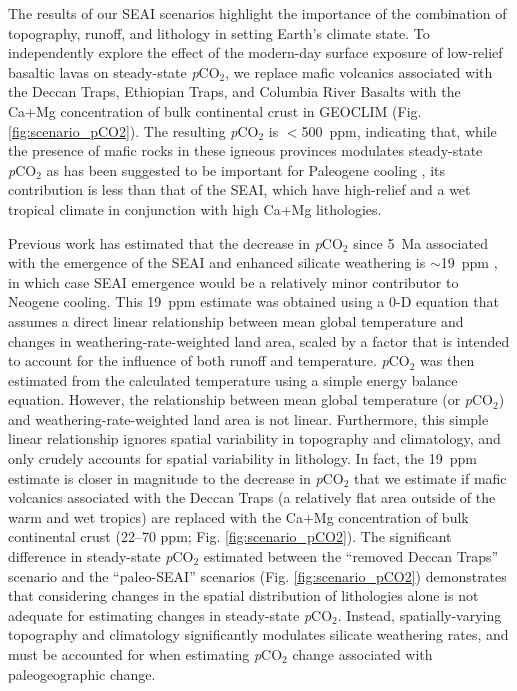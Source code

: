 \documentclass[9pt,twocolumn,twoside,lineno]{pnas-new}
\newcommand{\pCOtwo}{\textit{p}CO$_{2}$\xspace}
\begin{document}
The results of our SEAI scenarios highlight the importance of the combination of topography, runoff, and lithology in setting Earth's climate state. To independently explore the effect of the modern-day surface exposure of low-relief basaltic lavas on steady-state \pCOtwo \cite{Kent2013a}, we replace mafic volcanics associated with the Deccan Traps, Ethiopian Traps, and Columbia River Basalts with the Ca+Mg concentration of bulk continental crust in GEOCLIM (Fig. \ref{fig:scenario_pCO2}). The resulting \pCOtwo is $<$500~ppm, indicating that, while the presence of mafic rocks in these igneous provinces modulates steady-state \pCOtwo as has been suggested to be important for Paleogene cooling \cite{Kent2013a}, its contribution is less than that of the SEAI, which have high-relief and a wet tropical climate in conjunction with high Ca+Mg lithologies.

Previous work has estimated that the decrease in \pCOtwo since 5~Ma associated with the emergence of the SEAI and enhanced silicate weathering is $\sim$19~ppm \cite{Molnar2015a}, in which case SEAI emergence would be a relatively minor contributor to Neogene cooling. This 19~ppm estimate was obtained using a 0-D equation that assumes a direct linear relationship between mean global temperature and changes in weathering-rate-weighted land area, scaled by a factor that is intended to account for the influence of both runoff and temperature. \pCOtwo was then estimated from the calculated temperature using a simple energy balance equation. However, the relationship between mean global temperature (or \pCOtwo) and weathering-rate-weighted land area is not linear. Furthermore, this simple linear relationship ignores spatial variability in topography and climatology, and only crudely accounts for spatial variability in lithology. In fact, the 19~ppm estimate is closer in magnitude to the decrease in \pCOtwo that we estimate if mafic volcanics associated with the Deccan Traps (a relatively flat area outside of the warm and wet tropics) are replaced with the Ca+Mg concentration of bulk continental crust (22--70 ppm; Fig. \ref{fig:scenario_pCO2}). The significant difference in steady-state \pCOtwo estimated between the ``removed Deccan Traps'' scenario and the ``paleo-SEAI'' scenarios (Fig. \ref{fig:scenario_pCO2}) demonstrates that considering changes in the spatial distribution of lithologies alone is not adequate for estimating changes in steady-state \pCOtwo. Instead, spatially-varying topography and climatology significantly modulates silicate weathering rates, and must be accounted for when estimating \pCOtwo change associated with paleogeographic change.
\end{document}

